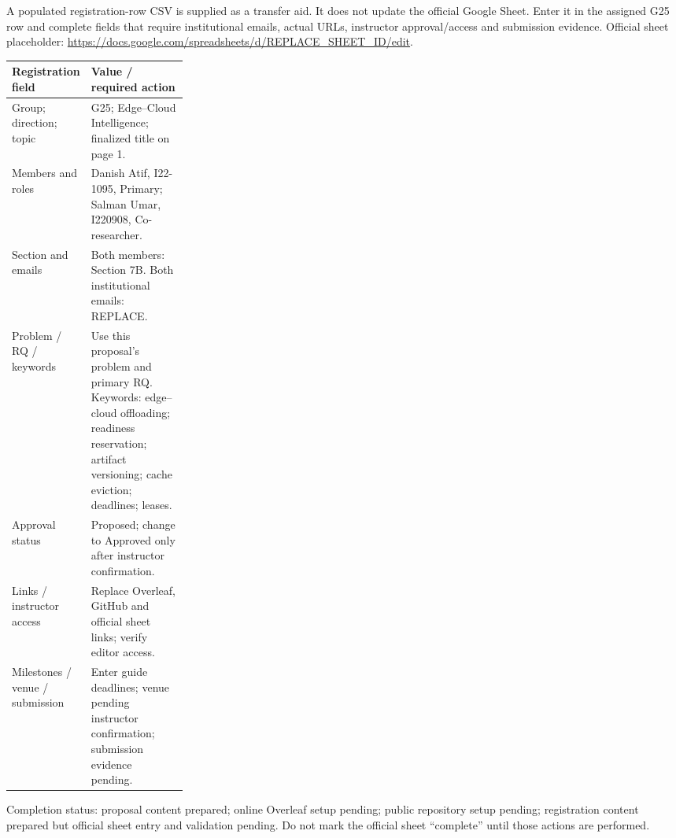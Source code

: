 \documentclass[11pt,a4paper]{article}
\begin{document}
A populated registration-row CSV is supplied as a transfer aid. It does not update the official Google Sheet. Enter it in the assigned G25 row and complete fields that require institutional emails, actual URLs, instructor approval/access and submission evidence. Official sheet placeholder: \url{https://docs.google.com/spreadsheets/d/REPLACE_SHEET_ID/edit}.

\begin{center}
\small
\begin{tabularx}{\linewidth}{|p{0.26\linewidth}|X|}
\hline
\textbf{Registration field} & \textbf{Value / required action} \\ \hline
Group; direction; topic & G25; Edge--Cloud Intelligence; finalized title on page 1. \\ \hline
Members and roles & Danish Atif, I22-1095, Primary; Salman Umar, I220908, Co-researcher. \\ \hline
Section and emails & Both members: Section 7B. Both institutional emails: REPLACE. \\ \hline
Problem / RQ / keywords & Use this proposal's problem and primary RQ. Keywords: edge--cloud offloading; readiness reservation; artifact versioning; cache eviction; deadlines; leases. \\ \hline
Approval status & Proposed; change to Approved only after instructor confirmation. \\ \hline
Links / instructor access & Replace Overleaf, GitHub and official sheet links; verify editor access. \\ \hline
Milestones / venue / submission & Enter guide deadlines; venue pending instructor confirmation; submission evidence pending. \\ \hline
\end{tabularx}
\end{center}

Completion status: proposal content prepared; online Overleaf setup pending; public repository setup pending; registration content prepared but official sheet entry and validation pending. Do not mark the official sheet ``complete'' until those actions are performed.
\end{document}
